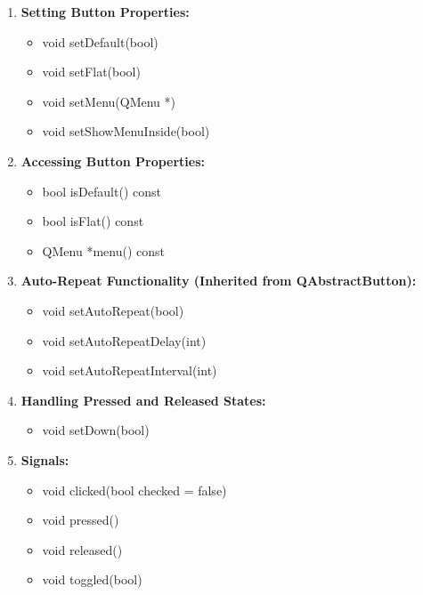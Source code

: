 \documentclass{report}
\begin{document}
    \pagebreak 
    \bigbreak \noindent 
    \begin{enumerate}
     \item \textbf{Setting Button Properties:}
        \begin{itemize}
            \item void setDefault(bool)
            \item void setFlat(bool)
            \item void setMenu(QMenu *)
            \item void setShowMenuInside(bool)
        \end{itemize}

        \item \textbf{Accessing Button Properties:}
        \begin{itemize}
            \item bool isDefault() const
            \item bool isFlat() const
            \item QMenu *menu() const
        \end{itemize}

        \item \textbf{Auto-Repeat Functionality (Inherited from QAbstractButton):}
        \begin{itemize}
            \item void setAutoRepeat(bool)
            \item void setAutoRepeatDelay(int)
            \item void setAutoRepeatInterval(int)
        \end{itemize}

        \item \textbf{Handling Pressed and Released States:}
        \begin{itemize}
            \item void setDown(bool)
        \end{itemize}

        \item \textbf{Signals:}
        \begin{itemize}
            \item void clicked(bool checked = false)
            \item void pressed()
            \item void released()
            \item void toggled(bool)
        \end{itemize}


\end{enumerate}
\end{document}

